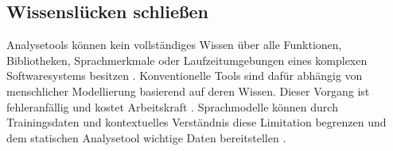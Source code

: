 \subsection{Wissenslücken schließen}

Analysetools können kein vollständiges Wissen über alle Funktionen, Bibliotheken, Sprachmerkmale oder Laufzeitumgebungen eines komplexen Softwaresystems besitzen \cite{liEnhancingStaticAnalysis2024}. Konventionelle Tools sind dafür abhängig von menschlicher Modellierung basierend auf deren Wissen. Dieser Vorgang ist fehleranfällig und kostet Arbeitskraft \cite{liIRISLLMAssistedStatic2024}. Sprachmodelle können durch Trainingsdaten und kontextuelles Verständnis diese Limitation begrenzen und dem statischen Analysetool wichtige Daten bereitstellen \cite{liEnhancingStaticAnalysis2024}. 